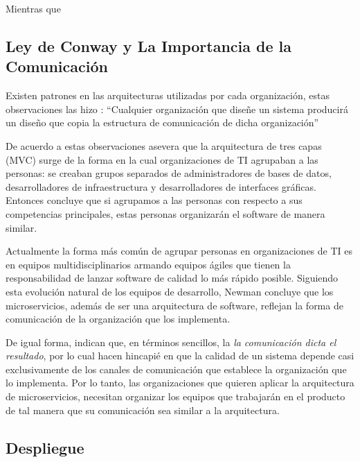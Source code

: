 Mientras que \cite{percival2020architecture}

\subsection{Ley de Conway y La Importancia de la Comunicación}

Existen patrones en las arquitecturas utilizadas por cada organización, estas observaciones
las hizo \cite{conway1968committees}: ``Cualquier organización que diseñe un sistema producirá
un diseño que copia la estructura de comunicación de dicha organización''


De acuerdo a estas observaciones \cite{newman2019monolith} asevera que la arquitectura de tres capas
(MVC) surge de la forma en la cual organizaciones de TI agrupaban a las personas: se creaban grupos
separados de administradores de bases de datos, desarrolladores de infraestructura y desarrolladores
de interfaces gráficas. Entonces concluye que si agrupamos a las personas con respecto a sus competencias
principales, estas personas organizarán el software de manera similar.

Actualmente la forma más común de agrupar personas en organizaciones de TI es en equipos multidisciplinarios
armando equipos ágiles que tienen la responsabilidad de lanzar software de calidad lo más rápido posible.
Siguiendo esta evolución natural de los equipos de desarrollo, Newman concluye que los microservicios,
además de ser una arquitectura de software, reflejan la forma de comunicación de la organización
que los implementa.

De igual forma, \cite{nadareishvili2016microservice} indican que, en términos sencillos, la
{\it la comunicación dicta el resultado}, por lo cual hacen hincapié en que la calidad de un sistema
depende casi exclusivamente de los canales de comunicación que establece la organización que lo implementa.
Por lo tanto, las organizaciones que quieren aplicar la arquitectura de microservicios, necesitan
organizar los equipos que trabajarán en el producto de tal manera que su comunicación sea similar a 
la arquitectura.


\subsection{Despliegue}



